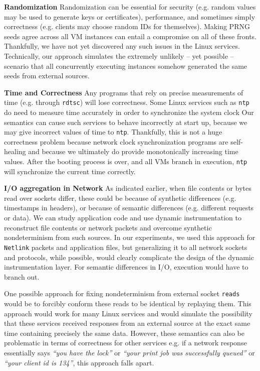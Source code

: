 \noindent \textbf{Randomization} \newline
Randomization can be essential for security (e.g. random values
may be used to generate keys or certificates),
performance, and sometimes simply correctness (e.g. 
clients may choose random IDs for themselves).
Making PRNG seeds agree across all VM instances can entail
a compromise on all of these fronts.
Thankfully, we have not yet discovered any such
issues in the Linux services. Technically,
our approach simulates the extremely unlikely 
-- yet possible -- scenario that all concurrently executing
instances somehow generated the same seeds
from external sources. \newline

\noindent \textbf{Time and Correctness} \newline
Any programs that rely on precise
measurements of time (e.g. through \texttt{rdtsc})
will lose correctness. 
Some Linux services such as \texttt{ntp} 
do need to measure time accurately in order to synchronize the system clock
Our semantics can cause such services to 
behave incorrectly at start up,
because we may give incorrect values
of time to \texttt{ntp}.
Thankfully, this is not a huge correctness problem because network 
clock synchronization programs are self-healing and
because we ultimately do provide monotonically
 increasing time values. After the booting process is over,
and all VMs branch in execution, \texttt{ntp} will synchronize
the current time correctly. \newline

\noindent \textbf{I/O aggregation in Network} \newline
As indicated earlier, when file contents
or bytes read over sockets differ, 
these could be because of synthetic differences (e.g.
timestamps in headers), or because of 
semantic differences (e.g. different requests or data).
We can study application code and use dynamic instrumentation
to reconstruct file contents or network packets and overcome synthetic nondeterminism
from such sources. In our experiments, we used this approach
for \texttt{Netlink} packets and application files, but generalizing it
to all network sockets and protocols, while possible, would clearly
complicate the design of the dynamic instrumentation
layer. For semantic differences in I/O, 
execution would have to branch out.

One possible approach for fixing nondeterminism from external
socket \texttt{reads} would be to forcibly
conform these reads to be identical by replaying
them. This approach would work for many 
Linux services and would simulate the possibility
that these services received responses from
an external source at the exact same time containing
precisely the same data. However, these semantics can
also be problematic in terms of correctness for other services
e.g. if a network 
response essentially says {\em ``you have the lock''} or 
{\em ``your print job was successfully queued''} or
{\em ``your client id is 134''},
this approach falls apart.

